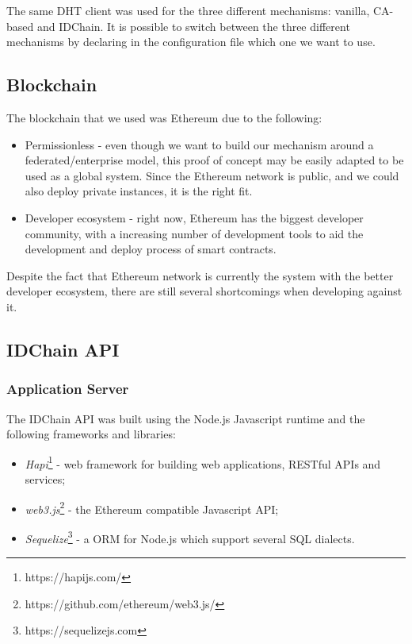 The same DHT client was used for the three different mechanisms: vanilla, CA-based and IDChain.
It is possible to switch between the three different mechanisms by declaring in the configuration file which one we want to use.

\subsection{Blockchain}

The blockchain that we used was Ethereum due to the following:

\begin{itemize}
  \item Permissionless - even though we want to build our mechanism around a federated/enterprise model, this proof of concept may be easily adapted to be used as a global system.
  Since the Ethereum network is public, and we could also deploy private instances, it is the right fit.
	\item Developer ecosystem - right now, Ethereum has the biggest developer community, with a increasing number of development tools to aid the development and deploy process of smart contracts.
\end{itemize}

Despite the fact that Ethereum network is currently the system with the better developer ecosystem, there are still several shortcomings when developing against it.

\subsection{IDChain API}

\subsubsection{Application Server}

The IDChain API was built using the Node.js Javascript runtime and the following frameworks and libraries:

\begin{itemize}
  \item \textit{Hapi}\footnote{https://hapijs.com/} - web framework for building web applications, RESTful APIs and services;
  \item \textit{web3.js}\footnote{https://github.com/ethereum/web3.js/} - the Ethereum compatible Javascript API;
  \item \textit{Sequelize}\footnote{https://sequelizejs.com} - a \ac{ORM} for Node.js which support several SQL dialects.
\end{itemize}

